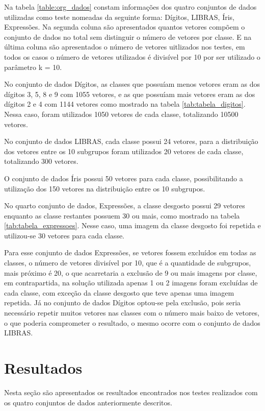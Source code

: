 Na tabela \ref{table:org_dados} constam informações dos quatro conjuntos de dados utilizadas como teste nomeadas da seguinte forma: Dígitos, LIBRAS, Íris, Expressões. Na segunda coluna são apresentados quantos vetores compõem o conjunto de dados no total sem distinguir o número de vetores por classe. E na última coluna são apresentados o número de vetores uitlizados nos testes, em todos os casos o número de vetores utilizados é divisível por 10 por ser utilizado o parâmetro k = 10.

No conjunto de dados Dígitos, as classes que possuíam menos vetores eram as dos dígitos 3, 5, 8 e 9 com 1055 vetores, e as que possuíam mais vetores eram as dos dígitos 2 e 4 com 1144 vetores como mostrado na tabela \ref{tab:tabela_digitos}. Nessa caso, foram utilizados 1050 vetores de cada classe, totalizando 10500 vetores.

No conjunto de dados LIBRAS, cada classe possui 24 vetores, para a distribuição dos vetores entre os 10 subgrupos foram utilizados 20 vetores de cada classe, totalizando 300 vetores.

O conjunto de dados Íris possui 50 vetores para cada classe, possibilitando a utilização dos 150 vetores na distribuição entre os 10 subgrupos.

No quarto conjunto de dados, Expressões, a classe desgosto possui 29 vetores enquanto as classe restantes possuem 30 ou mais, como mostrado na tabela \ref{tab:tabela_expressoes}. Nesse caso, uma imagem da classe desgosto foi repetida e utilizou-se 30 vetores para cada classe. 

Para esse conjunto de dados Expressões, se vetores fossem excluídos em todas as classes, o número de vetores divisível por 10, que é a quantidade de subgrupos, mais próximo é 20, o que acarretaria a exclusão de 9 ou mais imagens por classe, em contrapartida, na solução utilizada apenas 1 ou 2 imagens foram excluídas de cada classe, com exceção da classe desgosto que teve apenas uma imagem repetida. Já no conjunto de dados Dígitos optou-se pela exclusão, pois seria necessário repetir muitos vetores nas classes com o número mais baixo de vetores, o que poderia comprometer o resultado, o mesmo ocorre com o conjunto de dados LIBRAS.

\section{Resultados}
Nesta seção são apresentados os resultados encontrados nos testes realizados com os quatro conjuntos de dados anteriormente descritos. 


